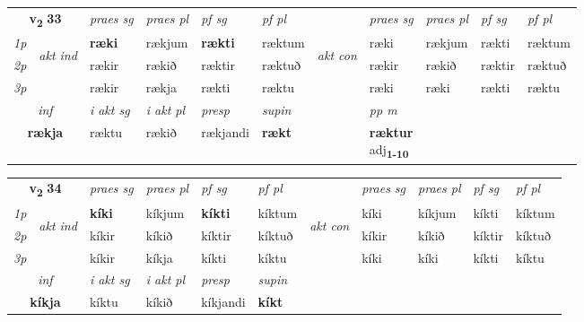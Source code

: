 \noindent
\begin{tabular}{lllllllllll} \toprule
\multicolumn{2}{c}{\textbf{v{\textsubscript{2}}} \Large{\textbf{33}}}  &  \textit{praes sg}  & \textit{praes pl}  &\textit{ pf sg} & \textit{pf pl} &  &  \textit{praes sg}  & \textit{praes pl}  & \textit{pf sg} & \textit{pf pl } \\*
	\cmidrule{3-6} \cmidrule{8-11}
 {\textit{1p}} & \multirow{3}{*}{\begin{turn}{90}\textit{akt ind}\end{turn}} & \textbf{ræki} & rækjum & \textbf{rækti} & ræktum & \multirow{3}{*}{\begin{turn}{90}\textit{akt con}\end{turn}} &ræki & rækjum & rækti & ræktum\\*
 {\textit{2p}} &  &  rækir  & rækið & ræktir & ræktuð & & rækir & rækið & ræktir & ræktuð \\*
{\textit{3p}} &  & rækir & rækja & rækti & ræktu & & ræki & ræki& rækti & ræktu \\*
\cmidrule{3-6} \cmidrule{8-11}

   \multicolumn{2}{c}{\textit{inf}}  & \textit{i akt sg} & \textit{i akt pl}   & \textit{presp} & \textit{supin}  && \textit{pp m} \\*
  \multicolumn{2}{c}{\textbf{rækja}} & ræktu  & rækið   & rækjandi &  \textbf{rækt}  && \specialcell{\textbf{ræktur} \\ adj\textbf{\textsubscript{1-10}}} \\*
\end{tabular}

\noindent
\begin{tabular}{lllllllllll} \toprule
\multicolumn{2}{c}{\textbf{v{\textsubscript{2}}} \Large{\textbf{34}}}  &  \textit{praes sg}  & \textit{praes pl}  &\textit{ pf sg} & \textit{pf pl} &  &  \textit{praes sg}  & \textit{praes pl}  & \textit{pf sg} & \textit{pf pl } \\*
	\cmidrule{3-6} \cmidrule{8-11}
 {\textit{1p}} & \multirow{3}{*}{\begin{turn}{90}\textit{akt ind}\end{turn}} & \textbf{kíki} & kíkjum & \textbf{kíkti} & kíktum & \multirow{3}{*}{\begin{turn}{90}\textit{akt con}\end{turn}} &kíki & kíkjum & kíkti & kíktum\\*
 {\textit{2p}} &  &  kíkir  & kíkið & kíktir & kíktuð & & kíkir & kíkið & kíktir & kíktuð \\*
{\textit{3p}} &  & kíkir & kíkja & kíkti & kíktu & & kíki & kíki& kíkti & kíktu \\*
\cmidrule{3-6} \cmidrule{8-11}

   \multicolumn{2}{c}{\textit{inf}}  & \textit{i akt sg} & \textit{i akt pl}   & \textit{presp} & \textit{supin}   \\*
  \multicolumn{2}{c}{\textbf{kíkja}} & kíktu  & kíkið   & kíkjandi &  \textbf{kíkt}   \\*
\end{tabular}


